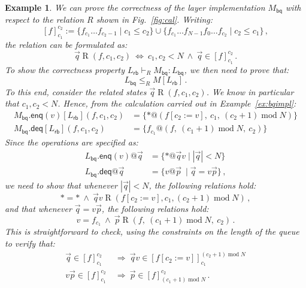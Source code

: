 \documentclass[draft,11pt]{report}
\newtheorem{example}[theorem]{Example}
\theoremstyle{definition}
\newcommand{\kw}[1]{\ensuremath{ \mathsf{#1} }}
\begin{document}
\begin{example} %
We can prove the correctness of
the layer implementation $M_\kw{bq}$
with respect to the relation $R$
shown in Fig.~\ref{fig:cal}.
Writing:
\[
  [f]_{c_1}^{c_2} :=
    \{ f_{c_1} \ldots f_{c_2 - 1} \mid c_1 \le c_2 \} \cup
    \{ f_{c_1} \ldots f_{N-1} f_0 \ldots f_{c_2} \mid c_2 \le c_1 \}
  \,,
\]
the relation can be formulated as:
\[
  \vec{q} \mathrel{R} (f, c_1, c_2)
  \: \Leftrightarrow \:
  c_1, c_2 < N
  \: \wedge \:
  \vec{q} \in [f]_{c_1}^{c_2}
  \,.
\]
To show the correctness property
$
  L_\kw{rb} \vdash_R M_\kw{bq} : L_\kw{bq}
$,
we then need to prove that:
\[
  L_\kw{bq} \le_R M[L_\kw{rb}]
  \,.
\]
To this end,
consider the related states
$\vec{q} \mathrel{R} (f, c_1, c_2)$.
We know in particular that $c_1, c_2 < N$.
Hence, from the calculation
carried out in Example~\ref{ex:bqimpl}:
\begin{align*}
  M_\kw{bq}.{\kw{enq}(v)}[L_\kw{rb}](f, c_1, c_2)
    &= \{ *@(f[c_2 := v], \:
          c_1, \:
          (c_2 + 1) \mathop{\mathrm{mod}} N) \}
  \\
  M_\kw{bq}.\kw{deq}[L_\kw{rb}](f, c_1, c_2)
    &= \{ f_{c_1}@(f, \:
          (c_1 + 1) \mathop{\mathrm{mod}} N, \:
          c_2) \}
\end{align*}
Since the operations are specified as:
\begin{align*}
  L_\kw{bq}.\kw{enq}(v)@\vec{q} &=
    \{ * @ \vec{q} v \mid |\vec{q}| < N \}
  \\
  L_\kw{bq}.\kw{deq}@\vec{q} &=
    \{ v @ \vec{p} \: \mid \vec{q} = v \vec{p} \}
  \,,
\end{align*}
we need to show that whenever
$|\vec{q}| < N$,
the following relations hold:
\[
  {*} = {*}
  \: \wedge \:
  \vec{q}v \mathrel{R}
    (f[c_2 := v], c_1, (c_2 + 1) \mathop{\mathrm{mod}} N)
  \,,
\]
and that whenever $\vec{q} = v\vec{p}$,
the following relations hold:
\[
  v = f_{c_1}
  \: \wedge \:
  \vec{p} \mathrel{R}
    (f, \:
     (c_1 + 1) \mathop{\mathrm{mod}} N, \:
     c_2)
  \,.
\]
This is straightforward to check,
using the constraints on the length of the queue
to verify that:
\begin{align*}
  \vec{q} \in [f]_{c_1}^{c_2}
    \: &\Rightarrow \:
    \vec{q}v \in [f[c_2 := v]]_{c_1}^{(c_2+1) \mathop{\mathrm{mod}} N}
  \\
  v\vec{p} \in [f]_{c_1}^{c_2}
    \: &\Rightarrow \:
    \vec{p} \in [f]_{(c_1+1) \mathop{\mathrm{mod}} N}^{c_2}
  \,.
\end{align*}
\end{example}
\end{document}
